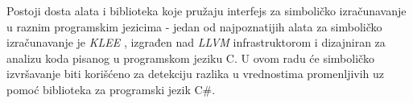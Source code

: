 Postoji dosta alata i biblioteka koje pružaju interfejs za simboličko izračunavanje u raznim programskim jezicima - jedan od najpoznatijih alata za simboličko izračunavanje je \emph{KLEE} \cite{KLEE}, izgrađen nad \emph{LLVM} infrastruktorom \cite{LLVM} i dizajniran za analizu koda pisanog u programskom jeziku C. U ovom radu će simboličko izvršavanje biti korišćeno za detekciju razlika u vrednostima promenljivih uz pomoć biblioteka za programski jezik C\#.
